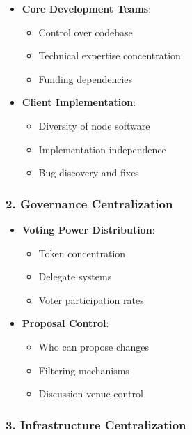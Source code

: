 \documentclass[
  letterpaper,
  DIV=11,
  numbers=noendperiod]{scrreprt}
\providecommand{\tightlist}{%
  \setlength{\itemsep}{0pt}\setlength{\parskip}{0pt}}\usepackage{longtable,booktabs,array}
\begin{document}
\begin{itemize}
\tightlist
\item
  \textbf{Core Development Teams}:

  \begin{itemize}
  \tightlist
  \item
    Control over codebase
  \item
    Technical expertise concentration
  \item
    Funding dependencies
  \end{itemize}
\item
  \textbf{Client Implementation}:

  \begin{itemize}
  \tightlist
  \item
    Diversity of node software
  \item
    Implementation independence
  \item
    Bug discovery and fixes
  \end{itemize}
\end{itemize}

\subsubsection{2. Governance
Centralization}\label{governance-centralization}

\begin{itemize}
\tightlist
\item
  \textbf{Voting Power Distribution}:

  \begin{itemize}
  \tightlist
  \item
    Token concentration
  \item
    Delegate systems
  \item
    Voter participation rates
  \end{itemize}
\item
  \textbf{Proposal Control}:

  \begin{itemize}
  \tightlist
  \item
    Who can propose changes
  \item
    Filtering mechanisms
  \item
    Discussion venue control
  \end{itemize}
\end{itemize}

\subsubsection{3. Infrastructure
Centralization}\label{infrastructure-centralization}
\end{document}
